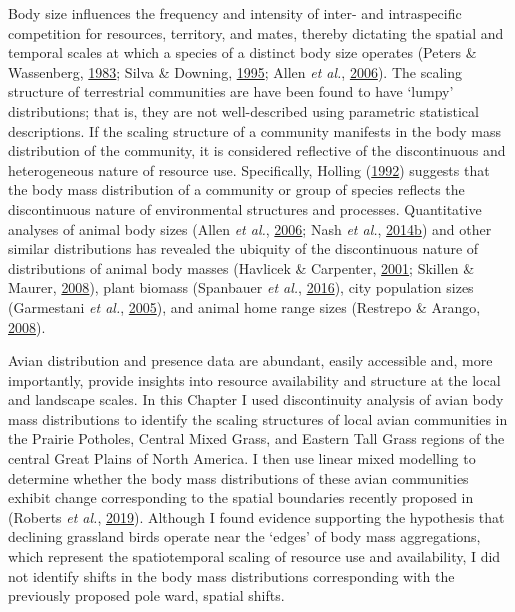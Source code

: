 \documentclass[print]{nuthesis}
\begin{document}
Body size influences the frequency and intensity of inter- and intraspecific competition for resources, territory, and mates, thereby dictating the spatial and temporal scales at which a species of a distinct body size operates (Peters \& Wassenberg, \protect\hyperlink{ref-peters1983effect}{1983}; Silva \& Downing, \protect\hyperlink{ref-silva1995allometric}{1995}; Allen \emph{et al.}, \protect\hyperlink{ref-allen2006patterns}{2006}). The scaling structure of terrestrial communities are have been found to have `lumpy' distributions; that is, they are not well-described using parametric statistical descriptions. If the scaling structure of a community manifests in the body mass distribution of the community, it is considered reflective of the discontinuous and heterogeneous nature of resource use. Specifically, Holling (\protect\hyperlink{ref-holling1992cross}{1992}) suggests that the body mass distribution of a community or group of species reflects the discontinuous nature of environmental structures and processes. Quantitative analyses of animal body sizes (Allen \emph{et al.}, \protect\hyperlink{ref-allen2006patterns}{2006}; Nash \emph{et al.}, \protect\hyperlink{ref-nash2014habitat}{2014}\protect\hyperlink{ref-nash2014habitat}{b}) and other similar distributions has revealed the ubiquity of the discontinuous nature of distributions of animal body masses (Havlicek \& Carpenter, \protect\hyperlink{ref-havlicek2001pelagic}{2001}; Skillen \& Maurer, \protect\hyperlink{ref-skillen2008ecological}{2008}), plant biomass (Spanbauer \emph{et al.}, \protect\hyperlink{ref-spanbauer2016body}{2016}), city population sizes (Garmestani \emph{et al.}, \protect\hyperlink{ref-garmestani2005time}{2005}), and animal home range sizes (Restrepo \& Arango, \protect\hyperlink{ref-restrepo2008discontinuities}{2008}).

Avian distribution and presence data are abundant, easily accessible and, more importantly, provide insights into resource availability and structure at the local and landscape scales. In this Chapter I used discontinuity analysis of avian body mass distributions to identify the scaling structures of local avian communities in the Prairie Potholes, Central Mixed Grass, and Eastern Tall Grass regions of the central Great Plains of North America. I then use linear mixed modelling to determine whether the body mass distributions of these avian communities exhibit change corresponding to the spatial boundaries recently proposed in (Roberts \emph{et al.}, \protect\hyperlink{ref-roberts2019shifting}{2019}). Although I found evidence supporting the hypothesis that declining grassland birds operate near the `edges' of body mass aggregations, which represent the spatiotemporal scaling of resource use and availability, I did not identify shifts in the body mass distributions corresponding with the previously proposed pole ward, spatial shifts.
\end{document}
